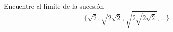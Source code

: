 \item Encuentre el límite de la sucesión
    \[ \{\sqrt{2}, \sqrt{2\sqrt{2}}, \sqrt{2\sqrt{2\sqrt{2}}}, \dots\} \]
